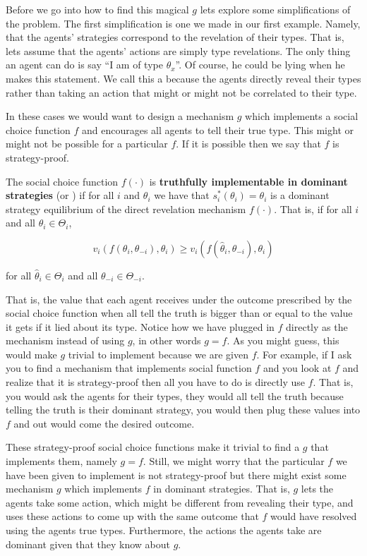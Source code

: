 Before we go into how to find this magical $g$ lets explore some
simplifications of the problem. The first simplification is one we
made in our first example. Namely, that the agents' strategies
correspond to the revelation of their types. That is, lets assume that
the agents' actions are simply type revelations. The only thing an
agent can do is say ``I am of type $\theta_x$''. Of course, he could
be lying when he makes this statement. We call this a  because the agents directly reveal their types
rather than taking an action that might or might not be correlated to
their type.

In these cases we would want to design a mechanism $g$ which
implements a social choice function $f$ and encourages all agents to
tell their true type. This might or might not be possible for a
particular $f$. If it is possible then we say that $f$ is
strategy-proof.

\begin{definition}
  The social choice function $f(\cdot)$ is \textbf{truthfully
    implementable in dominant strategies} (or )
  if for all $i$ and $\theta_i$ we have that $s_i^*(\theta_i) =
  \theta_i$ is a dominant strategy equilibrium of the direct
  revelation mechanism $f(\cdot)$. That is, if for all $i$ and all
  $\theta_i \in \Theta_i$,
  
  \[v_i(f(\theta_i,\theta_{-i}), \theta_i) \geq
  v_i(f(\hat{\theta}_i,\theta_{-i}), \theta_i)\]
  
  for all $\hat{\theta}_i \in \Theta_i$ and all $\theta_{-i} \in \Theta_{-i}$.
\end{definition}

That is, the value that each agent receives under the outcome
prescribed by the social choice function when all tell the truth is
bigger than or equal to the value it gets if it lied about its type.
Notice how we have plugged in $f$ directly as the mechanism instead of
using $g$, in other words $g = f$. As you might guess, this would make
$g$ trivial to implement because we are given $f$. For example, if I
ask you to find a mechanism that implements social function $f$ and
you look at $f$ and realize that it is strategy-proof then all you
have to do is directly use $f$. That is, you would ask the agents for
their types, they would all tell the truth because telling the truth
is their dominant strategy, you would then plug these values into $f$
and out would come the desired outcome.

These strategy-proof social choice functions make it trivial to find a
$g$ that implements them, namely $g = f$. Still, we might worry that
the particular $f$ we have been given to implement is not
strategy-proof but there might exist some mechanism $g$ which
implements $f$ in dominant strategies. That is, $g$ lets the agents
take some action, which might be different from revealing their type,
and uses these actions to come up with the same outcome that $f$ would
have resolved using the agents true types. Furthermore, the actions
the agents take are dominant given that they know about $g$.

